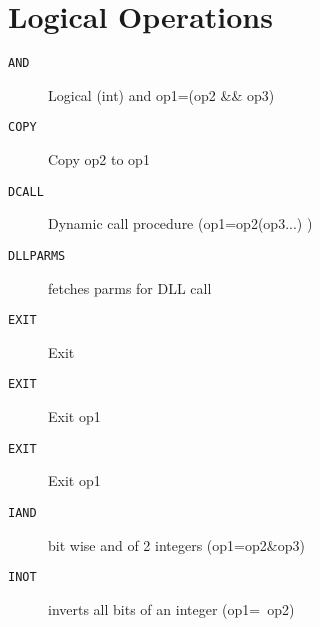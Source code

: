 \section{Logical Operations}
\begin{description}
\item[\texttt{AND}]  Logical (int) and op1=(op2 \&\& op3)\\

\end{description}
\begin{description}
\item[\texttt{COPY}]  Copy op2 to op1\\

\end{description}
\begin{description}
\item[\texttt{DCALL}]  Dynamic call procedure (op1=op2(op3...) )\\

\end{description}
\begin{description}
\item[\texttt{DLLPARMS}]  fetches parms for DLL call \\

\end{description}
\begin{description}
\item[\texttt{EXIT}]  Exit\\

\end{description}
\begin{description}
\item[\texttt{EXIT}]  Exit op1\\

\end{description}
\begin{description}
\item[\texttt{EXIT}]  Exit op1\\

\end{description}
\begin{description}
\item[\texttt{IAND}]  bit wise and of 2 integers (op1=op2\&op3)\\

\end{description}
\begin{description}
\item[\texttt{INOT}]  inverts all bits of an integer (op1=~op2)\\

\end{description}
